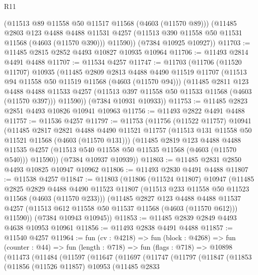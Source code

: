 \begin{lexlean}{R11}
\begin{coremodule}
        (@11513 @89 @11558 @50 @11517 @11568 (@4603 (@11570 @89)))
        (@11485
          @2803
          @123
          @4488
          @4488
          @11531
          @4257
          (@11513 @390 @11558 @50 @11531 @11568 (@4603 (@11570 @390)))
          @11590))
      (@7384 @10925 @10927))
@11703 := @11485 @2815 @2852 @4493 @10827 @10935 @10964
@11706 := @11493 @2814 @4491 @4488
@11707 := @11534 @4257
@11747 := @11703
    (@11706
      (@11520 @11707)
      @10935
      (@11485
        @2809
        @2813
        @4488
        @4490
        @11519
        @11707
        (@11513 @94 @11558 @50 @11519 @11568 (@4603 (@11570 @94)))
        (@11485
          @2811
          @123
          @4488
          @4488
          @11533
          @4257
          (@11513 @397 @11558 @50 @11533 @11568 (@4603 (@11570 @397)))
          @11590))
      (@7384 @10931 @10933))
@11753 := @11485 @2823 @2851 @4493 @10826 @10941 @10963
@11756 := @11493 @2822 @4491 @4488
@11757 := @11536 @4257
@11797 := @11753
    (@11756
      (@11522 @11757)
      @10941
      (@11485
        @2817
        @2821
        @4488
        @4490
        @11521
        @11757
        (@11513 @131 @11558 @50 @11521 @11568 (@4603 (@11570 @131)))
        (@11485
          @2819
          @123
          @4488
          @4488
          @11535
          @4257
          (@11513 @540 @11558 @50 @11535 @11568 (@4603 (@11570 @540)))
          @11590))
      (@7384 @10937 @10939))
@11803 := @11485 @2831 @2850 @4493 @10825 @10947 @10962
@11806 := @11493 @2830 @4491 @4488
@11807 := @11538 @4257
@11847 := @11803
    (@11806
      (@11524 @11807)
      @10947
      (@11485
        @2825
        @2829
        @4488
        @4490
        @11523
        @11807
        (@11513 @233 @11558 @50 @11523 @11568 (@4603 (@11570 @233)))
        (@11485
          @2827
          @123
          @4488
          @4488
          @11537
          @4257
          (@11513 @612 @11558 @50 @11537 @11568 (@4603 (@11570 @612)))
          @11590))
      (@7384 @10943 @10945))
@11853 := @11485 @2839 @2849 @4493 @4638 @10953 @10961
@11856 := @11493 @2838 @4491 @4488
@11857 := @11540 @4257
@11964 := fun (cv : @4218) =>
  fun (block : @4268) =>
  fun (counter : @44) =>
  fun (length : @718) =>
  fun (flags : @718) =>
  @10898
    (@11473
      (@11484
        (@11597
          (@11647
            (@11697
              (@11747
                (@11797
                  (@11847
                    (@11853
                      (@11856
                        (@11526 @11857)
                        @10953
                        (@11485
                          @2833

\end{coremodule}
\end{lexlean}
